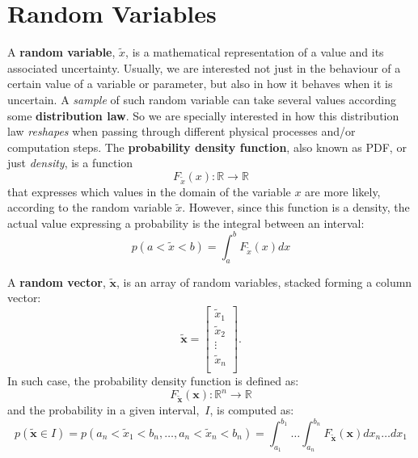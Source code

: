 \section{Random Variables}
A \textbf{random variable}, $\tilde{x}$, is a mathematical representation of a value and its associated uncertainty. Usually, we are interested not just in the behaviour of a certain value of a variable or parameter, but also in how it behaves when it is uncertain. A \textit{sample} of such random variable can take several values according some \textbf{distribution law}. So we are specially interested in how this distribution law \textit{reshapes} when passing through different physical processes and/or computation steps. The \textbf{probability density function}, also known as PDF, or just \textit{density}, is a function 
\begin{equation}
F_{\tilde{x}}(x):\mathbb{R}\rightarrow \mathbb{R} 
\end{equation}
that expresses which values in the domain of the variable $x$ are more likely, according to the random variable $\tilde{x}$. However, since this function is a density, the actual value expressing a probability is the integral between an interval:
\begin{equation}
p(a<\tilde{x}<b) = \int^b_a F_{\tilde{x}}(x) dx 
\end{equation}

A \textbf{random vector}, $\tilde{\mathbf{x}}$, is an array of random variables, stacked forming a column vector: 
\begin{equation}
\tilde{\mathbf{x}} =
\left[
\begin{array}{c}
 \tilde{x}_1\\
 \tilde{x}_2\\
 \vdots \\
 \tilde{x}_n\\
\end{array}
\right].
\end{equation}
In such case, the probability density function is defined as: 
\begin{equation}
F_{\tilde{\mathbf{x}}}(\mathbf{x}):\mathbb{R}^n\rightarrow \mathbb{R} 
\end{equation}
and the probability in a given interval,~$I$, is computed as:
\begin{equation}
p(\tilde{\mathbf{x}}\in I) = 
p(a_n<\tilde{x}_1<b_n,\dots,a_n<\tilde{x}_n<b_n) = 
\int^{b_1}_{a_1} \dots \int^{b_n}_{a_n} F_{\tilde{\mathbf{x}}}(\mathbf{x}) dx_n \dots dx_1 
\end{equation}

